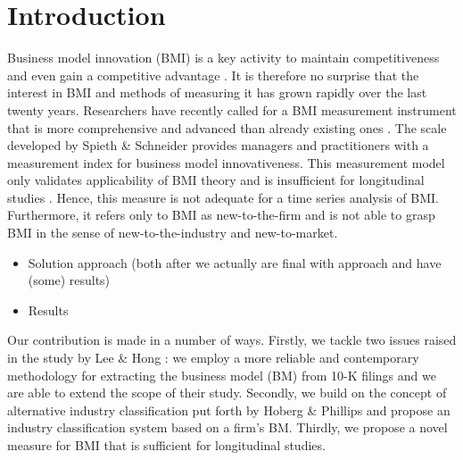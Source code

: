 \documentclass[manuscript,screen,review]{acmart}
\begin{document}



\maketitle

\setlength{\parskip}{-0.1pt}

\section{Introduction}\label{introduction}

Business model innovation (BMI) is a key activity to maintain
competitiveness and even gain a competitive advantage
\citep{pucihar_drivers_2019, teece_business_2018}. It is therefore no
surprise that the interest in BMI and methods of measuring it has grown
rapidly over the last twenty years. Researchers have recently called for
a BMI measurement instrument that is more comprehensive and advanced
than already existing ones \citep{huang_review_2023}. The scale
developed by Spieth \& Schneider \citeyearpar{spieth_business_2016}
provides managers and practitioners with a measurement index for
business model innovativeness. This measurement model only validates
applicability of BMI theory \citep{huang_review_2023} and is
insufficient for longitudinal studies \citep{clauss_measuring_2017}.
Hence, this measure is not adequate for a time series analysis of BMI.
Furthermore, it refers only to BMI as new-to-the-firm and is not able to
grasp BMI in the sense of new-to-the-industry and new-to-market.

\begin{itemize}
\item
  Solution approach (both after we actually are final with approach and
  have (some) results)
\item
  Results
\end{itemize}

Our contribution is made in a number of ways. Firstly, we tackle two
issues raised in the study by Lee \& Hong
\citeyearpar{lee_business_2014}: we employ a more reliable and
contemporary methodology for extracting the business model (BM) from
10-K filings and we are able to extend the scope of their study.
Secondly, we build on the concept of alternative industry classification
put forth by Hoberg \& Phillips \citeyearpar{hoberg_text-based_2016} and
propose an industry classification system based on a firm's BM. Thirdly,
we propose a novel measure for BMI that is sufficient for longitudinal
studies.
\end{document}
